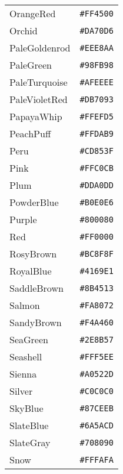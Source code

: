 \documentclass[a4paper]{article}
\begin{document}
\begin{longtable}{|l|r|}
OrangeRed & \texttt{\#FF4500} \cellcolor[HTML]{FF4500} \\
Orchid & \texttt{\#DA70D6} \cellcolor[HTML]{DA70D6} \\
PaleGoldenrod & \texttt{\#EEE8AA} \cellcolor[HTML]{EEE8AA} \\
PaleGreen & \texttt{\#98FB98} \cellcolor[HTML]{98FB98} \\
PaleTurquoise & \texttt{\#AFEEEE} \cellcolor[HTML]{AFEEEE} \\
PaleVioletRed & \texttt{\#DB7093} \cellcolor[HTML]{DB7093} \\
PapayaWhip & \texttt{\#FFEFD5} \cellcolor[HTML]{FFEFD5} \\
PeachPuff & \texttt{\#FFDAB9} \cellcolor[HTML]{FFDAB9} \\
Peru & \texttt{\#CD853F} \cellcolor[HTML]{CD853F} \\
Pink & \texttt{\#FFC0CB} \cellcolor[HTML]{FFC0CB} \\
Plum & \texttt{\#DDA0DD} \cellcolor[HTML]{DDA0DD} \\
PowderBlue & \texttt{\#B0E0E6} \cellcolor[HTML]{B0E0E6} \\
Purple & \texttt{\#800080} \cellcolor[HTML]{800080} \\
Red & \texttt{\#FF0000} \cellcolor[HTML]{FF0000} \\
RosyBrown & \texttt{\#BC8F8F} \cellcolor[HTML]{BC8F8F} \\
RoyalBlue & \texttt{\#4169E1} \cellcolor[HTML]{4169E1} \\
SaddleBrown & \texttt{\#8B4513} \cellcolor[HTML]{8B4513} \\
Salmon & \texttt{\#FA8072} \cellcolor[HTML]{FA8072} \\
SandyBrown & \texttt{\#F4A460} \cellcolor[HTML]{F4A460} \\
SeaGreen & \texttt{\#2E8B57} \cellcolor[HTML]{2E8B57} \\
Seashell & \texttt{\#FFF5EE} \cellcolor[HTML]{FFF5EE} \\
Sienna & \texttt{\#A0522D} \cellcolor[HTML]{A0522D} \\
Silver & \texttt{\#C0C0C0} \cellcolor[HTML]{C0C0C0} \\
SkyBlue & \texttt{\#87CEEB} \cellcolor[HTML]{87CEEB} \\
SlateBlue & \texttt{\#6A5ACD} \cellcolor[HTML]{6A5ACD} \\
SlateGray & \texttt{\#708090} \cellcolor[HTML]{708090} \\
Snow & \texttt{\#FFFAFA} \cellcolor[HTML]{FFFAFA} \\

\end{longtable}
\end{document}
